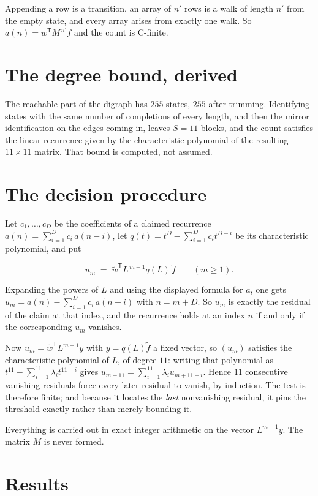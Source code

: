 \documentclass[11pt]{article}
\theoremstyle{definition}
\begin{document}
Appending a row is a transition, an array of $n'$ rows is a walk of length $n'$ from the empty state, and every array arises from exactly one walk. So $a(n) = w^{\mathsf T}M^{\,n'}f$ and the count is C-finite.

\section{The degree bound, derived}

The reachable part of the digraph has $255$ states, $255$ after trimming. Identifying states with the same number of completions of every length, and then the mirror identification on the edges coming in, leaves $S = 11$ blocks, and the count satisfies the linear recurrence given by the characteristic polynomial of the resulting $11\times11$ matrix. That bound is computed, not assumed.

\section{The decision procedure}

Let $c_1,\dots,c_D$ be the coefficients of a claimed recurrence $a(n) = \sum_{i=1}^{D} c_i\,a(n-i)$, let $q(t) = t^{D} - \sum_{i=1}^{D} c_i t^{D-i}$ be its characteristic polynomial, and put

\[u_m \;=\; \tilde w^{\mathsf T} L^{\,m-1} q(L)\,\tilde f \qquad (m \ge 1).\]

Expanding the powers of $L$ and using the displayed formula for $a$, one gets $u_m = a(n) - \sum_{i=1}^{D} c_i\,a(n-i)$ with $n = m + D$. So $u_m$ is exactly the residual of the claim at that index, and the recurrence holds at an index $n$ if and only if the corresponding $u_m$ vanishes.

Now $u_m = \tilde w^{\mathsf T} L^{m-1} y$ with $y = q(L)\tilde f$ a fixed vector, so $(u_m)$ satisfies the characteristic polynomial of $L$, of degree $11$: writing that polynomial as $t^{11} - \sum_{i=1}^{11} \lambda_i t^{11-i}$ gives $u_{m+11} = \sum_{i=1}^{11} \lambda_i u_{m+11-i}$. Hence $11$ consecutive vanishing residuals force every later residual to vanish, by induction. The test is therefore finite; and because it locates the {\itshape last} nonvanishing residual, it pins the threshold exactly rather than merely bounding it.

Everything is carried out in exact integer arithmetic on the vector $L^{m-1}y$. The matrix $M$ is never formed.

\section{Results}
\end{document}
